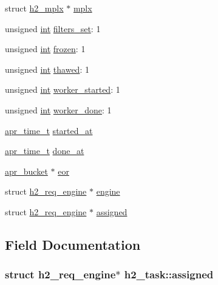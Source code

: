 \begin{DoxyCompactItemize}
\begin{tabbing}
\end{tabbing}\item 
struct \hyperlink{structh2__mplx}{h2\+\_\+mplx} $\ast$ \hyperlink{structh2__task_a01c334a460577a071ad2c6c76ff55373}{mplx}
\item 
unsigned \hyperlink{pcre_8txt_a42dfa4ff673c82d8efe7144098fbc198}{int} \hyperlink{structh2__task_a6ddca7aaac5ae30453c0dcc1b8bdb323}{filters\+\_\+set}\+: 1
\item 
unsigned \hyperlink{pcre_8txt_a42dfa4ff673c82d8efe7144098fbc198}{int} \hyperlink{structh2__task_a9b609f6afd847458e9ebe0fd1dc2a6b4}{frozen}\+: 1
\item 
unsigned \hyperlink{pcre_8txt_a42dfa4ff673c82d8efe7144098fbc198}{int} \hyperlink{structh2__task_aec7b0cca43b057051907da207a95958a}{thawed}\+: 1
\item 
unsigned \hyperlink{pcre_8txt_a42dfa4ff673c82d8efe7144098fbc198}{int} \hyperlink{structh2__task_aedbac35d4cfc160ffbf7d50779e9fce8}{worker\+\_\+started}\+: 1
\item 
unsigned \hyperlink{pcre_8txt_a42dfa4ff673c82d8efe7144098fbc198}{int} \hyperlink{structh2__task_afdaef75e0241b6099654f12255202845}{worker\+\_\+done}\+: 1
\item 
\hyperlink{group__apr__time_gadb4bde16055748190eae190c55aa02bb}{apr\+\_\+time\+\_\+t} \hyperlink{structh2__task_a014791f4fee83070c1b8b52806ce3502}{started\+\_\+at}
\item 
\hyperlink{group__apr__time_gadb4bde16055748190eae190c55aa02bb}{apr\+\_\+time\+\_\+t} \hyperlink{structh2__task_a5dfa4103355422703d3e1a8b07733f73}{done\+\_\+at}
\item 
\hyperlink{structapr__bucket}{apr\+\_\+bucket} $\ast$ \hyperlink{structh2__task_ab1e3e9ee3fe43ee82f8e82b7563f10b4}{eor}
\item 
struct \hyperlink{structh2__req__engine}{h2\+\_\+req\+\_\+engine} $\ast$ \hyperlink{structh2__task_a79899299fec2d024b6d30c63af12daf9}{engine}
\item 
struct \hyperlink{structh2__req__engine}{h2\+\_\+req\+\_\+engine} $\ast$ \hyperlink{structh2__task_afc8a45828ada4b6a8da5cf66bee1dffd}{assigned}
\end{DoxyCompactItemize}


\subsection{Field Documentation}
\subsubsection[{\texorpdfstring{assigned}{assigned}}]{\setlength{\rightskip}{0pt plus 5cm}struct {\bf h2\+\_\+req\+\_\+engine}$\ast$ h2\+\_\+task\+::assigned}\hypertarget{structh2__task_afc8a45828ada4b6a8da5cf66bee1dffd}{}\label{structh2__task_afc8a45828ada4b6a8da5cf66bee1dffd}
